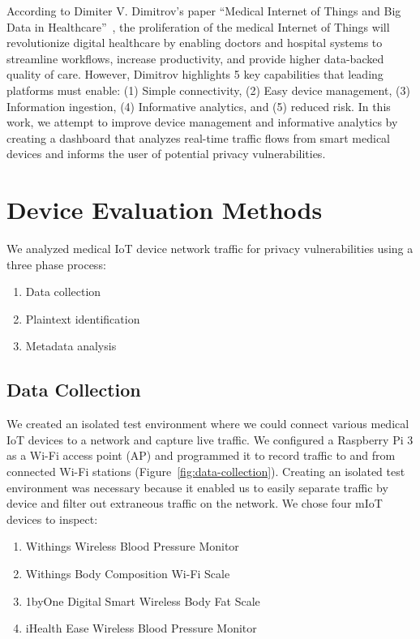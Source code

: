 According to Dimiter V. Dimitrov's paper ``Medical Internet of Things and Big Data in Healthcare''~\cite{dimitrovIoT},
the proliferation of the medical Internet of Things will revolutionize digital healthcare by enabling doctors and hospital systems to streamline workflows, increase productivity, and provide higher data-backed quality of care. However, Dimitrov highlights 5 key capabilities that leading platforms must enable: (1) Simple connectivity, (2) Easy device management, (3) Information ingestion, (4) Informative analytics, and (5) reduced risk. In this work, we attempt to improve device management and informative analytics by creating a dashboard that analyzes real-time traffic flows from smart medical devices and informs the user of potential privacy vulnerabilities.

\section{Device Evaluation Methods}

We analyzed medical IoT device network traffic for privacy vulnerabilities using a three phase process:

\begin{enumerate}
  \item Data collection
  \item Plaintext identification
  \item Metadata analysis
\end{enumerate}

\subsection{Data Collection}

We created an isolated test environment where we could connect various medical IoT devices to a network and capture live traffic. We configured a Raspberry Pi 3 as a Wi-Fi access point (AP) and programmed it to record traffic to and from connected Wi-Fi stations (Figure~\ref{fig:data-collection}).  Creating an isolated test environment was necessary because it enabled us to easily separate traffic by device and filter out extraneous traffic on the network.   We chose four mIoT devices to inspect:

\begin{enumerate}
  \item Withings Wireless Blood Pressure Monitor
  \item Withings Body Composition Wi-Fi Scale
  \item 1byOne Digital Smart Wireless Body Fat Scale
  \item iHealth Ease Wireless Blood Pressure Monitor
\end{enumerate}

